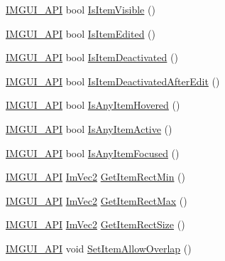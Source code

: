 \begin{DoxyCompactItemize}
\item 
\mbox{\hyperlink{imgui_8h_a43829975e84e45d1149597467a14bbf5}{I\+M\+G\+U\+I\+\_\+\+A\+PI}} bool \mbox{\hyperlink{namespace_im_gui_a0e9273fc53bdf7ca39d59cdb657c3c2f}{Is\+Item\+Visible}} ()
\item 
\mbox{\hyperlink{imgui_8h_a43829975e84e45d1149597467a14bbf5}{I\+M\+G\+U\+I\+\_\+\+A\+PI}} bool \mbox{\hyperlink{namespace_im_gui_a6508c0e1f28d1e7f9328a944b4f35ff7}{Is\+Item\+Edited}} ()
\item 
\mbox{\hyperlink{imgui_8h_a43829975e84e45d1149597467a14bbf5}{I\+M\+G\+U\+I\+\_\+\+A\+PI}} bool \mbox{\hyperlink{namespace_im_gui_ada3b1cb76907bb9e630b2482f52f0599}{Is\+Item\+Deactivated}} ()
\item 
\mbox{\hyperlink{imgui_8h_a43829975e84e45d1149597467a14bbf5}{I\+M\+G\+U\+I\+\_\+\+A\+PI}} bool \mbox{\hyperlink{namespace_im_gui_a8bb4c0fc2b9d0e90249310bb4e822485}{Is\+Item\+Deactivated\+After\+Edit}} ()
\item 
\mbox{\hyperlink{imgui_8h_a43829975e84e45d1149597467a14bbf5}{I\+M\+G\+U\+I\+\_\+\+A\+PI}} bool \mbox{\hyperlink{namespace_im_gui_a0512146617bb55e24ebcfbe3ce6553d5}{Is\+Any\+Item\+Hovered}} ()
\item 
\mbox{\hyperlink{imgui_8h_a43829975e84e45d1149597467a14bbf5}{I\+M\+G\+U\+I\+\_\+\+A\+PI}} bool \mbox{\hyperlink{namespace_im_gui_acdc18199d50d26919312db5f9707b8dc}{Is\+Any\+Item\+Active}} ()
\item 
\mbox{\hyperlink{imgui_8h_a43829975e84e45d1149597467a14bbf5}{I\+M\+G\+U\+I\+\_\+\+A\+PI}} bool \mbox{\hyperlink{namespace_im_gui_a89514ca4c0a2b883c878736d92352656}{Is\+Any\+Item\+Focused}} ()
\item 
\mbox{\hyperlink{imgui_8h_a43829975e84e45d1149597467a14bbf5}{I\+M\+G\+U\+I\+\_\+\+A\+PI}} \mbox{\hyperlink{struct_im_vec2}{Im\+Vec2}} \mbox{\hyperlink{namespace_im_gui_a65b24b72ec0e8444c705cebf3e91f570}{Get\+Item\+Rect\+Min}} ()
\item 
\mbox{\hyperlink{imgui_8h_a43829975e84e45d1149597467a14bbf5}{I\+M\+G\+U\+I\+\_\+\+A\+PI}} \mbox{\hyperlink{struct_im_vec2}{Im\+Vec2}} \mbox{\hyperlink{namespace_im_gui_a3d260209b8dc25a2c942e8cfd1ed0e51}{Get\+Item\+Rect\+Max}} ()
\item 
\mbox{\hyperlink{imgui_8h_a43829975e84e45d1149597467a14bbf5}{I\+M\+G\+U\+I\+\_\+\+A\+PI}} \mbox{\hyperlink{struct_im_vec2}{Im\+Vec2}} \mbox{\hyperlink{namespace_im_gui_a3303d1c37041307e11fd46fc43b2274d}{Get\+Item\+Rect\+Size}} ()
\item 
\mbox{\hyperlink{imgui_8h_a43829975e84e45d1149597467a14bbf5}{I\+M\+G\+U\+I\+\_\+\+A\+PI}} void \mbox{\hyperlink{namespace_im_gui_a3291356b06ebe5f771d60b334a831d4b}{Set\+Item\+Allow\+Overlap}} ()

\end{DoxyCompactItemize}
